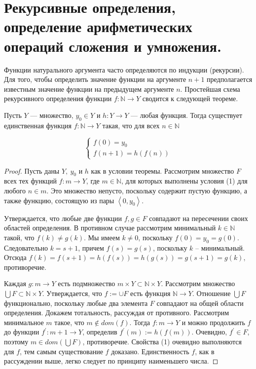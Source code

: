 \section{Рекурсивные определения, определение арифметических операций сложения и умножения.}

Функции натурального аргумента часто определяются по индукции (рекурсии). Для того, чтобы определить значение функции на аргументе $n+1$ предполагается известным значение функции на предыдущем аргументе $n$. Простейшая схема рекурсивного определения функции $f: \mathbb{N} \rightarrow Y$ сводится к следующей теореме. 

\begin{theorem}
Пусть $Y$ — множество, $y_{0} \in Y$ и $h: Y \rightarrow Y$ — любая
функция. Тогда существует единственная функция $f: \mathbb{N} \rightarrow Y$ такая,
что для всех $n \in \mathbb{N}$

\begin{equation}
\left\{\begin{array}{l}
{f(0)=y_{0}} \\
{f(n+1)=h(f(n))}
\end{array}\right.
\end{equation}

\end{theorem}

\begin{proof}

Пусть даны $Y, \ y_0$ и $h$ как в условии теоремы. Рассмотрим множество $F$ всех тех функций $f: m \rightarrow Y$, где $m \in \mathbb{N}$, для которых выполнены условия (1) для любого $n \in m$. Это множество непусто,
поскольку содержит пустую функцию, а также функцию, состоящую из
пары $\left\langle 0, y_{0}\right\rangle$.

Утверждается, что любые две функции $f, g \in F$ совпадают на пересечении своих областей определения. В противном случае рассмотрим минимальный $k \in \mathbb{N}$ такой, что $f(k) \neq g(k)$. Мы имеем $k \neq 0$, поскольку $f(0)=y_{0}=g(0)$. Следовательно $k=s+1$, причем $f(s) = g(s)$, поскольку $k$ -- минимальный. Отсюда $f(k)=f(s+1)=h(f(s))=h(g(s))=g(s+1)=g(k)$, противоречие.

Каждая $g: m \rightarrow Y$ есть подмножество $m \times Y \subset \mathbb{N} \times Y$. Рассмотрим множество $\bigcup F \subset \mathbb{N} \times Y$. Утверждается, что $f:=\cup F$ есть функция $\mathbb{N} \rightarrow Y$. Отношение $\bigcup F$ функционально, поскольку любые два элемента $F$ совпадают на общей области определения. Докажем тотальность, рассуждая от противного. Рассмотрим минимальное $m$ такое, что
$m \notin dom(f)$. Тогда $f: m \rightarrow Y$ и можно продолжить $f$ до функции $f^\prime : m+1 \rightarrow Y$, определив $f^\prime (m) := h(f(m))$. Очевидно, $f^\prime \in F$, поэтому $m \in dom(\bigcup F)$, противоречие. Свойства (1) очевидно выполняются для $f$, тем самым существование $f$ доказано.
Единственность $f$, как в рассуждении выше, легко следует по принципу наименьшего числа.
\end{proof}

